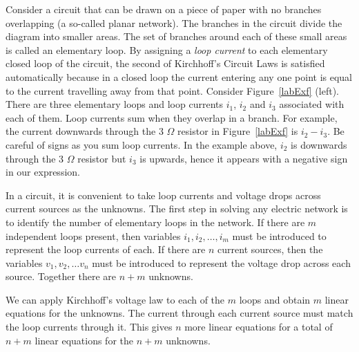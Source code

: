 Consider a circuit that can be drawn on a piece of paper with no
branches overlapping (a so-called planar network). The branches in the
circuit divide the diagram into smaller areas. The set of branches
around each of these small areas is called an elementary loop. By
assigning a \emph{loop current} to each elementary closed loop of the
circuit, the second of Kirchhoff's Circuit Laws is satisfied
automatically because in a closed loop the current entering any one
point is equal to the current travelling away from that point. Consider
Figure~\ref{labExf} (left). There are three elementary loops and loop
currents $i_1$, $i_2$ and $i_3$ associated with each of them. Loop
currents sum when they overlap in a branch. For example, the current
downwards through the 3 $\Omega$ resistor in Figure~\ref{labExf} is $i_2
- i_3$. Be careful of signs as you sum loop currents. In the example
above, $i_2$ is downwards through the 3 $\Omega$ resistor but $i_3$ is
upwards, hence it appears with a negative sign in our expression.

In a circuit, it is convenient to take loop currents and voltage drops
across current sources as the unknowns.  The first step in solving any
electric network is to identify the number of elementary loops in the
network. If there are $m$ independent loops present, then variables
$i_1,i_2,\ldots,i_m$ must be introduced to represent the loop
currents of each. If there are $n$ current sources, then the variables
$v_1, v_2, \ldots v_n$ must be introduced to represent the voltage
drop across each source. Together there are $n+m$ unknowns.

We can apply Kirchhoff's voltage law to each of the $m$ loops and
obtain $m$ linear equations for the unknowns. The current through each
current source must match the loop currents through it. This gives $n$
more linear equations for a total of $n+m$ linear equations for the
$n+m$ unknowns. 

